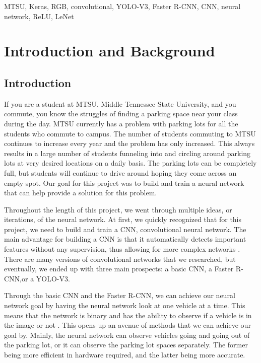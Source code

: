 \documentclass[conference]{IEEEtran}
\begin{document}

\begin{IEEEkeywords}
MTSU, Keras, RGB, convolutional, YOLO-V3, Faster R-CNN, CNN, neural network, ReLU, LeNet
\end{IEEEkeywords}

\section{Introduction and Background}

\subsection{Introduction}
If you are a student at MTSU, Middle Tennessee State University, and you commute, you know the struggles of finding a parking space near your class during the day. MTSU currently has a problem with parking lots for all the students who commute to campus. The number of students commuting to MTSU continues to increase every year and the problem has only increased. This always results in a large number of students funneling into and circling around parking lots at very desired locations on a daily basis. The parking lots can be completely full, but students will continue to drive around hoping they come across an empty spot. Our goal for this project was to build and train a neural network that can help provide a solution for this problem. 

Throughout the length of this project, we went through multiple ideas, or iterations, of the neural network. At first, we quickly recognized that for this project, we need to build and train a CNN, convolutional neural network. The main advantage for building a CNN is that it automatically detects important features without any supervision, thus allowing for more complex networks \cite{b1}. There are many versions of convolutional networks that we researched, but eventually, we ended up with three main prospects: a basic CNN, a Faster R-CNN,or a YOLO-V3. 

Through the basic CNN and the Faster R-CNN, we can achieve our neural network goal by having the neural network look at one vehicle at a time. This means that the network is binary and has the ability to observe if a vehicle is in the image or not \cite{b1}. This opens up an avenue of methods that we can achieve our goal by. Mainly, the neural network can observe vehicles going and going out of the parking lot, or it can observe the parking lot spaces separately. The former being more efficient in hardware required, and the latter being more accurate.
\end{document}
